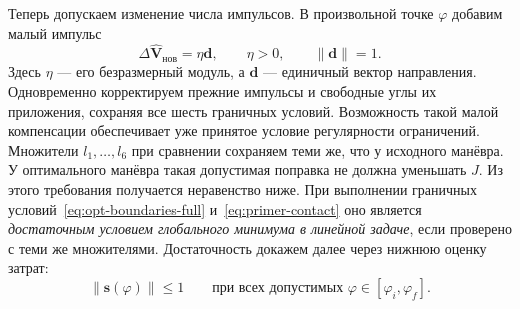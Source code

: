 Теперь допускаем изменение числа импульсов. В произвольной
точке $\varphi$ добавим малый импульс
\[
 \Delta\widehat{\boldsymbol V}_{\text{нов}}=\eta\boldsymbol d,
 \qquad \eta>0,\qquad \|\boldsymbol d\|=1.
\]
Здесь $\eta$ --- его безразмерный модуль, а $\boldsymbol d$ ---
единичный вектор направления. Одновременно корректируем прежние
импульсы и свободные углы их приложения, сохраняя все шесть граничных условий.
Возможность такой малой компенсации обеспечивает уже принятое
условие регулярности ограничений. Множители $l_1,\ldots,l_6$
при сравнении сохраняем теми же, что у исходного манёвра.
У оптимального манёвра такая допустимая поправка не должна
уменьшать $J$. Из этого требования получается неравенство ниже.
При выполнении граничных условий~\eqref{eq:opt-boundaries-full}
и~\eqref{eq:primer-contact} оно является \emph{достаточным условием
глобального минимума в линейной задаче}, если проверено с теми же
множителями. Достаточность докажем далее через нижнюю оценку затрат:
\begin{equation}
 \|\boldsymbol s(\varphi)\|\leq1
 \qquad\text{при всех допустимых }\varphi\in[\varphi_i,\varphi_f].
 \label{eq:primer-global-bound-full}
\end{equation}
